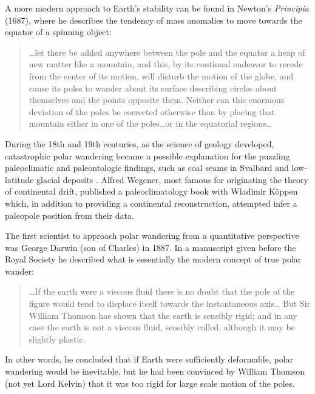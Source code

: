 A more modern approach to Earth's stability can be found in Newton's \emph{Principia} (1687),
where he describes the tendency of mass anomalies to move towards the equator of a spinning object:
\begin{quote}
\ldots let there be added anywhere between the pole and the equator a heap of new matter like a mountain,
and this, by its continual endeavor to recede from the center of its motion, will disturb the motion of the globe, 
and cause its poles to wander about its surface describing circles about themselves and the points opposite them.
Neither can this enormous deviation of the poles be corrected otherwise than by placing that mountain either in
one of the poles\ldots or in the equatorial regions\ldots
\end{quote}

During the 18th and 19th centuries, as the science of geology developed, catastrophic polar wandering
became a possible explanation for the puzzling paleoclimatic and paleontologic findings, such as coal
seams in Svalbard and low-latitude glacial deposits \citep{barrell1914status}.
Alfred Wegener, most famous for originating the theory of continental drift,
published a paleoclimatology book with Wladimir K\"oppen \citep{koppen1924} which,
in addition to providing a continental reconstruction, attempted infer a paleopole
position from their data.

The first scientist to approach polar wandering from a quantitative perspective was
George Darwin (son of Charles) in 1887. In a manuscript given before the Royal Society \citep{darwin1887influence}
he described what is essentially the modern concept of true polar wander:
\begin{quote}
\ldots If the earth were a viscous fluid there is no doubt that the pole of the figure would
tend to displace itself towards the instantaneous axis\ldots 
But Sir William Thomson has shown that the earth is sensibly rigid; 
and in any case the earth is not a viscous fluid, sensibly called, although it may be slightly plastic.
\end{quote}
In other words, he concluded that if Earth were sufficiently deformable, 
polar wandering would be inevitable, but he had been convinced by William Thomson (not yet Lord Kelvin)
that it was too rigid for large scale motion of the poles.

